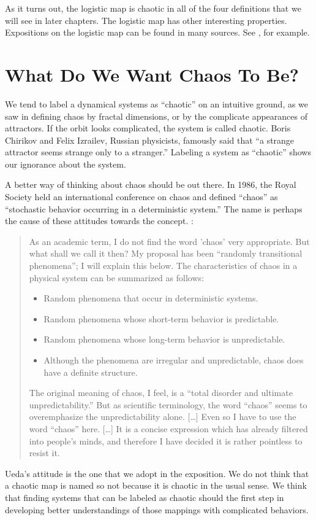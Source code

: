 \documentclass[12pt,twoside]{book}
\begin{document}
As it turns out, the logistic map is chaotic in all of the four definitions that we will see in later chapters.
The logistic map has other interesting properties.
Expositions on the logistic map can be found in many sources.
See \citep{may1, may2, devaney}, for example.

\section{What Do We Want Chaos To Be?}
We tend to label a dynamical systems as ``chaotic'' on an intuitive ground, as we saw in defining chaos by fractal dimensions, or by the complicate appearances of attractors.
If the orbit looks complicated, the system is called chaotic.
Boris Chirikov and Felix Izrailev, Russian physicists, famously said that ``a strange attractor seems strange only to a stranger.'' \citep{lorentzbook}
Labeling a system as ``chaotic'' shows our ignorance about the system.

A better way of thinking about chaos should be out there.
In 1986, the Royal Society held an international conference on chaos and defined ``chaos'' as ``stochastic behavior occurring in a deterministic system.'' \cite{stewart}
The name is perhaps the cause of these attitudes towards the concept.
\citet[24]{ueda-abraham}:
\begin{quotation}
  As an academic term, I do not find the word 'chaos' very appropriate.
  But what shall we call it then?
  My proposal has been ``randomly transitional phenomena''; I will explain this below.
  The characteristics of chaos in a physical system can be summarized as follows:
\begin{itemize}
  \item Random phenomena that occur in deterministic systems.
  \item Random phenomena whose short-term behavior is predictable.
  \item Random phenomena whose long-term behavior is unpredictable.
  \item Although the phenomena are irregular and unpredictable, chaos does have a definite structure.
\end{itemize}
  The original meaning of chaos, I feel, is a ``total disorder and ultimate unpredictability.''
  But as scientific terminology, the word ``chaos'' seems to overemphasize the unpredictability alone.
  [\ldots]
  Even so I have to use the word ``chaos'' here. [\ldots]
  It is a concise expression which has already filtered into people's minds, and therefore I have decided it is rather pointless to resist it.
\end{quotation}
Ueda's attitude is the one that we adopt in the exposition.
We do not think that a chaotic map is named so not because it is chaotic in the usual sense.
We think that finding systems that can be labeled as chaotic should the first step in developing better understandings of those mappings with complicated behaviors.
\end{document}
